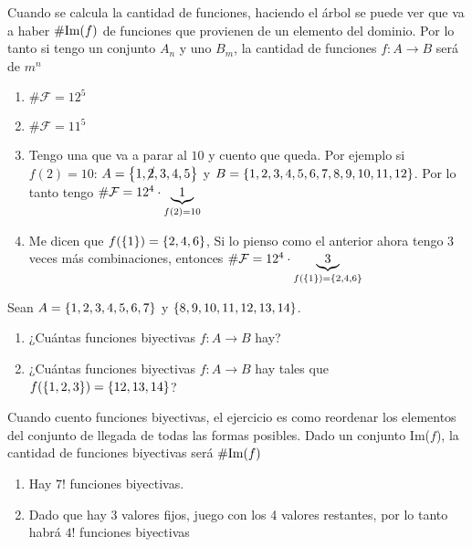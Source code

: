 \documentclass[12pt,a4paper, spanish]{article}
\begin{document}
\separadorCorto

Cuando se calcula la cantidad de funciones, haciendo el árbol se puede ver que va a haber $\#\text{Im}(f)$ de funciones que provienen
de un elemento del dominio. Por lo tanto si tengo un conjunto $A_n$ y uno $B_m$, la cantidad de funciones $f : A \to B$ será
de $m^n$\\

\begin{enumerate}[label=\roman*)]
	\item $\# \mathcal F = 12^5$

	\item $\# \mathcal F = 11^5$

	\item Tengo una que va a parar al $10$ y cuento que queda. Por ejemplo si $f(2) = 10$: $A = \left\{ 1,\cancel{2},3,4,5 \right\}$ y $B = \left\{ 1,2,3,4,5,6,7,8,9,10,11,12 \right\}$.
	      Por lo tanto tengo $\# \mathcal F = 12^4 \cdot \underbrace{\normalsize 1}_{f (2) = 10}$\\

	\item Me dicen que $f(\left\{ 1 \right\}) = \left\{ 2,4,6 \right\}$,
	      Si lo pienso como el anterior ahora tengo 3 veces más combinaciones, entonces
	      $\# \mathcal F = 12^4 \cdot \underbrace{\tiny 3}_{ f (\left\{ 1 \right\})= \left\{ 2,4,6 \right\}}$
\end{enumerate}

\ejercicio
Sean $A = \left\{ 1,2,3,4,5,6,7 \right\}$ y $\left\{ 8,9,10,11,12,13,14 \right\}$.
\begin{enumerate}[label=\roman*)]
	\item ¿Cuántas funciones biyectivas $f: A \to B$ hay?
	\item ¿Cuántas funciones biyectivas $f: A \to B$ hay tales que $f(\left\{ 1,2,3 \right\}) = \left\{ 12,13,14 \right\}$?
\end{enumerate}

\separadorCorto

Cuando cuento funciones biyectivas, el ejercicio es como reordenar los elementos del conjunto de llegada de todas las
formas posibles. Dado un conjunto Im($f$), la cantidad de funciones biyectivas será $\#\text{Im}(f)$

\begin{enumerate}[label=\roman*)]
	\item Hay $7!$ funciones biyectivas.
	\item Dado que hay 3 valores fijos, juego con los 4 valores restantes, por lo tanto habrá $4!$ funciones biyectivas
\end{enumerate}
\end{document}
